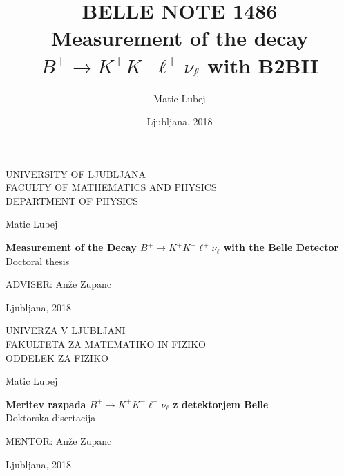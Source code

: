 \documentclass[longbibliography,a4paper,12pt]{book}
\title{{\Large BELLE NOTE 1486}\\\huge {Measurement of the decay $B^+ \to K^+K^-\ell^+\nu_\ell$ with B2BII}}
\author{Matic Lubej}
\date{Ljubljana, 2018}
\begin{document}
\nocite{*}


\pagestyle{empty}
\begin{center}

{\large UNIVERSITY OF LJUBLJANA\\
FACULTY OF MATHEMATICS AND PHYSICS\\
DEPARTMENT OF PHYSICS\\}

\vspace{4cm}

{\Large Matic Lubej\\}

\vspace{10mm}

{\bf \Large Measurement of the Decay $B^+ \to K^+K^-\ell^+\nu_\ell$ with the Belle Detector\\}
\vspace{5mm}
{\large Doctoral thesis}\\

\vfill

{\large ADVISER: An\v ze Zupanc\\
}

\vspace{2cm}
{\large Ljubljana, 2018}

\end{center}


\cleardoublepage
\begin{center}

{\large UNIVERZA V LJUBLJANI\\
FAKULTETA ZA MATEMATIKO IN FIZIKO\\
ODDELEK ZA FIZIKO\\}

\vspace{4cm}

{\Large Matic Lubej\\}

\vspace{10mm}

{\bf \Large Meritev razpada $B^+ \to K^+K^-\ell^+\nu_\ell$ z detektorjem Belle\\}
\vspace{5mm}
{\large Doktorska disertacija}\\

\vfill

{\large MENTOR: An\v ze Zupanc\\
}


\vspace{2cm}

{\large Ljubljana, 2018}

\end{center}
\end{document}

